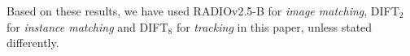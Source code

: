 \documentclass[letterpaper, 10 pt, conference]{ieeeconf}  %
\newcommand{\thomas}[1]{{\color{ForestGreen} TL: #1}}
\begin{document}
Based on these results, we have used RADIOv2.5-B for \textit{image matching}, DIFT$_2$ for \textit{instance matching} and DIFT$_8$ for \textit{tracking} in this paper, unless stated differently.




\end{document}

